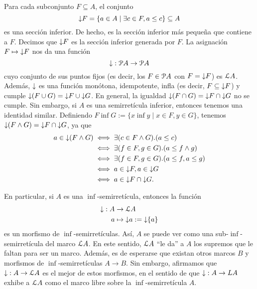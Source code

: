 Para cada subconjunto $F\subseteq A$, el conjunto
\[
  \down F = \{a\in A \mid \exists c\in F , a\leq c\} \subseteq A
\]
es una sección inferior.
De hecho, es la sección inferior más pequeña que contiene a $F$.
Decimos que $\down F$ es la sección inferior generada por $F$.
La asignación $F\mapsto\down F$ nos da una función
\[
  \down:\cal PA\to\cal PA
\]
cuyo conjunto de sus puntos fijos
(es decir, los $F\in\cal PA$ con $F=\down F$) es $\cal LA$.
Además, $\down$ es una función monótona, idempotente, infla
(es decir, $F\subseteq\down F$) y cumple $\down(F\cup G)=\down
F\cup\down G$.
En general, la igualdad $\down(F\cap G)=\down F\cap\down G$ no se
cumple. Sin embargo, si $A$ es una semirretícula inferior,
entonces tenemos una identidad similar.
Definiendo $F\inf G := \{x\inf y \mid x\in F, y\in G\}$,
tenemos $\down(F\inf G)= \down F\cap\down G$, ya que
\begin{align*}
  a\in\down(F\inf G)
  &\iff \exists(c\in F\inf G).(a\leq c) \\
  &\iff \exists(f\in F,g\in G).(a\leq f\inf g) \\
  &\iff \exists(f\in F,g\in G).(a\leq f, a\leq g) \\
  &\iff a\in \down F, a\in \down G \\
  &\iff a\in \down F\cap\down G.
\end{align*}

En particular, si $A$ es una $\inf$-semirretícula,
entonces la función
\begin{align*}
    \down : A&\to \cal LA \\
    a&\mapsto \down a:=\down\{a\}
\end{align*}
es un morfismo de $\inf$-semirretículas.
Así, $A$ se puede ver como una sub-$\inf$-semirretícula del marco
$\cal LA$.
En este sentido, $\cal LA$ ``le da'' a $A$ los supremos que le
faltan para ser un marco.
Además, es de esperarse que existan otros marcos $B$ y morfismos
de $\inf$-semirretículas $A\to B$. Sin embargo, afirmamos que
$\down:A\to\cal LA$ es el mejor de estos morfismos, en el sentido
de que $\down:A\to LA$ exhibe a $\cal LA$ como el marco libre
sobre la $\inf$-semirretícula $A$.

